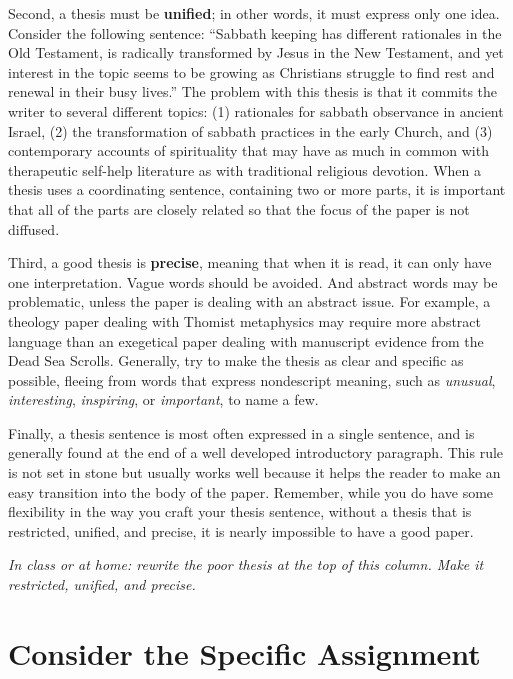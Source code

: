 \documentclass[11pt,twocolumn]{article}
\begin{document}
Second, a thesis must be \textbf{unified}; in other words, it must
express only one idea. Consider the following sentence: “Sabbath keeping
has different rationales in the Old Testament, is radically transformed
by Jesus in the New Testament, and yet interest in the topic seems to be
growing as Christians struggle to find rest and renewal in their busy
lives.” The problem with this thesis is that it commits the writer to
several different topics: (1) rationales for sabbath observance in
ancient Israel, (2) the transformation of sabbath practices in the early
Church, and (3) contemporary accounts of spirituality that may have as
much in common with therapeutic self-help literature as with traditional
religious devotion. When a thesis uses a coordinating sentence,
containing two or more parts, it is important that all of the parts are
closely related so that the focus of the paper is not diffused.

Third, a good thesis is \textbf{precise}, meaning that when it is read,
it can only have one interpretation. Vague words should be avoided. And
abstract words may be problematic, unless the paper is dealing with an
abstract issue. For example, a theology paper dealing with Thomist
metaphysics may require more abstract language than an exegetical paper
dealing with manuscript evidence from the Dead Sea Scrolls. Generally,
try to make the thesis as clear and specific as possible, fleeing from
words that express nondescript meaning, such as \emph{unusual},
\emph{interesting}, \emph{inspiring}, or \emph{important}, to name a
few.

Finally, a thesis sentence is most often expressed in a single sentence,
and is generally found at the end of a well developed introductory
paragraph. This rule is not set in stone but usually works well because
it helps the reader to make an easy transition into the body of the
paper. Remember, while you do have some flexibility in the way you craft
your thesis sentence, without a thesis that is restricted, unified, and
precise, it is nearly impossible to have a good paper.

\vfill

{\noindent\itshape In class or at home: rewrite the poor thesis
at the top of this column. Make it restricted, unified, and precise.}

\section{Consider the Specific Assignment}
\end{document}
